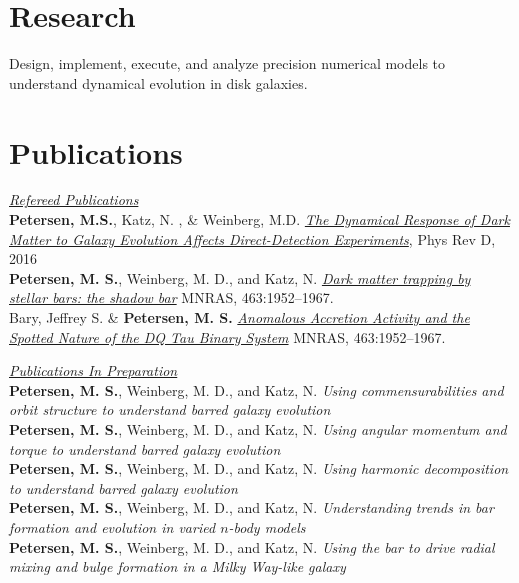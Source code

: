 \documentclass[margin, 12pt]{res} %
\begin{document}
\begin{resume}
\section{\sc Research} 

Design, implement, execute, and analyze precision numerical models to understand dynamical evolution in disk galaxies.
 

\section{\sc Publications} 
 \underline{\sl Refereed Publications} \\
{\bf Petersen, M.S.}, Katz, N. , \& Weinberg, M.D. \href{http://adsabs.harvard.edu/abs/2016PhRvD..94l3013P}{{\it The Dynamical Response of Dark Matter to Galaxy Evolution Affects Direct-Detection Experiments}}, Phys Rev D, 2016\\
{\bf Petersen, M. S.}, Weinberg, M. D., and Katz, N. \href{http://adsabs.harvard.edu/abs/2016MNRAS.463.1952P}{{\it  Dark matter trapping by stellar bars: the shadow bar}} MNRAS, 463:1952–1967.\\
Bary, Jeffrey S. \& {\bf Petersen, M. S.} \href{http://adsabs.harvard.edu/abs/2014ApJ...792...64B}{{\it Anomalous Accretion Activity and the Spotted Nature of the DQ Tau Binary System}} MNRAS, 463:1952–1967.

\vspace*{8pt}

\underline{\sl Publications In Preparation} \\
{\bf Petersen, M. S.}, Weinberg, M. D., and Katz, N. {\it Using commensurabilities and orbit structure to understand barred galaxy evolution}\\
{\bf Petersen, M. S.}, Weinberg, M. D., and Katz, N. {\it Using angular momentum and torque to understand barred galaxy evolution} \\
{\bf Petersen, M. S.}, Weinberg, M. D., and Katz, N. {\it Using harmonic decomposition to understand barred galaxy evolution} \\
{\bf Petersen, M. S.}, Weinberg, M. D., and Katz, N. {\it Understanding trends in bar formation and evolution in varied $n$-body models} \\
{\bf Petersen, M. S.}, Weinberg, M. D., and Katz, N. {\it Using the bar to drive radial mixing and bulge formation in a Milky Way-like galaxy} \\


\end{resume}
\end{document}
